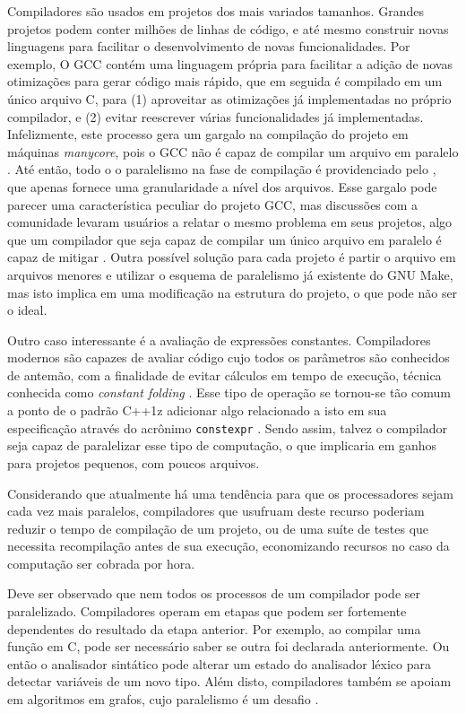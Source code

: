 Compiladores são usados em projetos dos mais variados tamanhos.
Grandes projetos podem conter milhões de linhas de código, e até mesmo
construir novas linguagens para facilitar o desenvolvimento de novas
funcionalidades. Por exemplo, O GCC contém uma linguagem própria para facilitar
a adição de novas otimizações para gerar código mais rápido, que em seguida é
compilado em um único arquivo C, para (1) aproveitar as otimizações já
implementadas no próprio compilador, e (2) evitar reescrever várias
funcionalidades já implementadas. Infelizmente, este processo
gera um gargalo na compilação do projeto em máquinas \textit{manycore}, pois o
GCC não é capaz de compilar um arquivo em paralelo \citep{pr84402}. Até então, todo o o
paralelismo na fase de compilação é providenciado pelo \cite{make}, que apenas
fornece uma granularidade a nível dos arquivos. Esse gargalo pode parecer uma
característica peculiar do projeto GCC, mas discussões com a comunidade levaram
usuários a relatar o mesmo problema em seus projetos, algo que um compilador
que seja capaz de compilar um único arquivo em paralelo é capaz de mitigar
\citep{mailgcc} \citep{phoronix}. Outra possível solução para cada
projeto é partir o arquivo em arquivos menores e utilizar o esquema de
paralelismo já existente do GNU Make, mas isto implica em uma modificação na
estrutura do projeto, o que pode não ser o ideal.

Outro caso interessante é a avaliação de expressões constantes. Compiladores
modernos são capazes de avaliar código cujo todos os parâmetros são conhecidos
de antemão, com a finalidade de evitar cálculos em tempo de execução, técnica
conhecida como \textit{constant folding} \citep{dragonbook}. Esse tipo de
operação se tornou-se tão comum a ponto de o padrão C++1z adicionar algo
relacionado a isto em sua especificação através do acrônimo \texttt{constexpr}
\citep{iso148822017}.
Sendo assim, talvez o compilador seja capaz de paralelizar esse tipo de
computação, o que implicaria em ganhos para projetos pequenos, com poucos
arquivos.

Considerando que atualmente há uma tendência para que os processadores sejam
cada vez mais paralelos, compiladores que usufruam deste recurso poderiam
reduzir o tempo de compilação de um projeto, ou de uma suíte de testes que
necessita recompilação antes de sua execução, economizando recursos no caso da
computação ser cobrada por hora.

Deve ser observado que nem todos os processos de um compilador pode ser
paralelizado. Compiladores operam em etapas que podem ser fortemente
dependentes do resultado da etapa anterior. Por exemplo, ao compilar uma
função em C, pode ser necessário saber se outra foi declarada anteriormente. Ou
então o analisador sintático pode alterar um estado do analisador léxico para
detectar variáveis de um novo tipo. Além disto, compiladores também se apoiam em algoritmos
em grafos, cujo paralelismo é um desafio \citep{lumsdaine2007challenges}.

